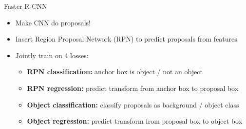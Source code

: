 \documentclass[10pt]{beamer}
\theoremstyle{remark}
\theoremstyle{definition}
\begin{document}
\begin{frame}{Faster R-CNN}
\begin{itemize}
    \item Make CNN do proposals!
    \item Insert Region Proposal Network (RPN) to predict proposals from features
    \pause
    \item Jointly train on 4 losses:
    \begin{itemize}
        \item \textbf{RPN classification:} anchor box is object / not an object
        \item \textbf{RPN regression:} predict transform from anchor box to proposal box
        \item \textbf{Object classification:} classify proposals as background / object class
        \item \textbf{Object regression:} predict transform from proposal box to object box
    \end{itemize}
\end{itemize}
    
\end{frame}
\end{document}
